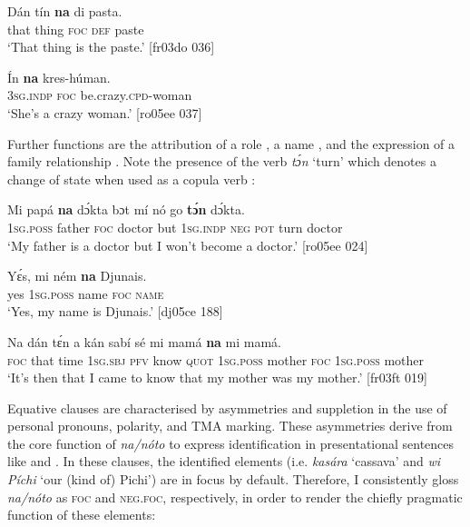 \ea%
    \label{ex:key:761}
    \gll Dán    tín    \textbf{na}  di pasta.\\
that    thing  \textsc{foc}  \textsc{def}  paste\\

\glt ‘That thing is the paste.’ [fr03do 036]
\z


\ea%
    \label{ex:key:762}
    \gll \'{I}n    \textbf{na} kres-húman.\\
\textsc{3sg.indp}  \textsc{foc}  be.crazy.\textsc{cpd}{}-woman\\

\glt ‘She’s a crazy woman.’ [ro05ee 037]
\z

Further functions are the attribution of a role , a name , and the expression of a family relationship . Note the presence of the verb \textit{tɔ́n} ‘turn’ which denotes a change of state when used as a copula verb : 


\ea%
    \label{ex:key:763}
    \gll Mi    papá  \textbf{na} dɔ́kta  bɔt  mí    nó  go  \textbf{tɔ́n}  dɔ́kta.\\
\textsc{1sg.poss}  father  \textsc{foc}  doctor  but  \textsc{1sg.indp}  \textsc{neg}  \textsc{pot}  turn  doctor\\

\glt ‘My father is a doctor but I won’t become a doctor.’ [ro05ee 024]
\z


\ea%
    \label{ex:key:764}
    \gll Yɛ́s,  mi    ném    \textbf{na}  Djunais.\\
yes  \textsc{1sg.poss}  name  \textsc{foc}  \textsc{name}\\

\glt ‘Yes, my name is Djunais.’ [dj05ce 188]
\z


\ea%
    \label{ex:key:765}
    \gll Na  dán  tɛ́n  a    kán  sabí    sé    mi    mamá 
\textbf{na} mi    mamá.\\
\textsc{foc}  that  time  \textsc{1sg.sbj}  \textsc{pfv}  know  \textsc{quot}    \textsc{1sg.poss}  mother 
\textsc{foc}  \textsc{1sg.poss}  mother\\

\glt ‘It’s then that I came to know that my mother was my mother.’ [fr03ft 019]
\z

Equative clauses are characterised by asymmetries and suppletion in the use of personal pronouns, polarity, and \textsc{TMA} marking. These asymmetries derive from the core function of \textit{na}\textit{\textup{/}}\textit{nóto} to express identification in presentational sentences like  and . In these clauses, the identified elements (i.e. \textit{kasára} ‘cassava’ and \textit{wi Píchi} ‘our (kind of) Pichi’) are in focus by default. Therefore, I consistently gloss \textit{na}\textit{\textup{/}}\textit{nóto} as \textsc{foc} and \textsc{neg.foc,} respectively, in order to render the chiefly pragmatic function of these elements: 


